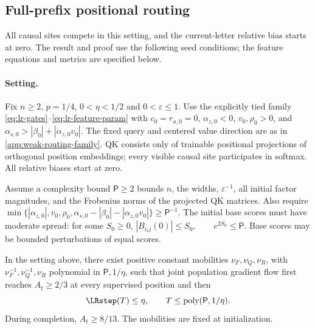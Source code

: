 \subsection{Full-prefix positional routing}
\label{app:weak-seeded-full-prefix-routing}

All causal sites compete in this setting, and the current-letter relative bias
starts at zero. The result and proof use the following seed conditions; the
feature equations and metrics are specified below.



\paragraph{Setting.}\label{app:lr-setting}
Fix $n\ge2$, $p=1/4$, $0<\eta<1/2$ and $0<\varepsilon\le1$.
Use the explicitly tied family \eqref{eq:lr-gates}--\eqref{eq:lr-feature-param}
with $c_0=r_{u,0}=0$, $\alpha_{z,0}<0$, $v_0,\rho_0>0$, and
$\alpha_{s,0}>|\beta_0|+|\alpha_{z,0}v_0|$. The fixed query and centered value direction
are as in \cref{app:weak-routing-family}. QK consists only of trainable
positional projections of orthogonal position embeddings; every visible
causal site participates in softmax. All relative biases start at zero.

Assume a complexity bound $\mathsf P\ge2$ bounds $n$, the widths,
$\varepsilon^{-1}$, all initial factor magnitudes, and the Frobenius norms
of the projected QK matrices. Also require
 $\min\{|\alpha_{z,0}|,v_0,\rho_0,\alpha_{s,0}-|\beta_0|-|\alpha_{z,0}v_0|\}\ge \mathsf P^{-1}.$ 
The initial base scores must have moderate spread: for some $S_0\ge0$,
 $|B_{i_tj}(0)|\le S_0,\qquad e^{2S_0}\le \mathsf P.$ 
Base scores may be bounded perturbations of equal scores.

\begin{lrtheorem}
\label{thm:lr-conditional-bridge}
In the setting above, there exist positive constant mobilities
$\nu_F,\nu_Q,\nu_R$, with $\nu_F^{-1},\nu_Q^{-1},\nu_R$
polynomial in $\mathsf P,1/\eta$, such that joint population gradient flow first
reaches $A_t\ge2/3$ at every supervised position and then
\begin{equation}\label{eq:lr-finite-theorem}
 \LRstep(T)\le\eta,\qquad T\le\operatorname{poly}(\mathsf P,1/\eta).
\end{equation}
During completion, $A_t\ge8/13$. The mobilities are fixed at initialization.
\end{lrtheorem}



